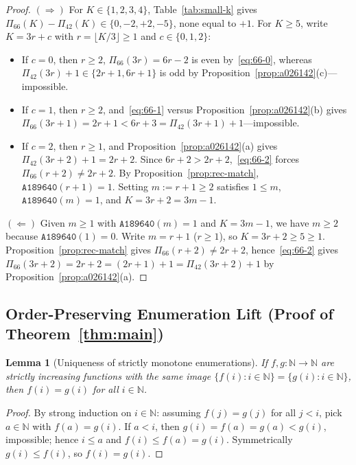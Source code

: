 \documentclass[11pt]{article}
\newtheorem{lemma}[theorem]{Lemma}
\theoremstyle{definition}
\newcommand{\N}{\mathbb{N}}
\newcommand{\seq}[1]{\texttt{#1}}
\begin{document}
\begin{proof}
$(\Rightarrow)$ For $K \in \{1, 2, 3, 4\}$, Table~\ref{tab:small-k} gives $\Pi_{66}(K) - \Pi_{42}(K) \in \{0, -2, +2, -5\}$, none equal to $+1$. For $K \ge 5$, write $K = 3r + c$ with $r = \lfloor K/3 \rfloor \ge 1$ and $c \in \{0, 1, 2\}$:
\begin{itemize}
\item If $c = 0$, then $r \ge 2$, $\Pi_{66}(3r) = 6r - 2$ is even by~\eqref{eq:66-0}, whereas $\Pi_{42}(3r) + 1 \in \{2r + 1, 6r + 1\}$ is odd by Proposition~\ref{prop:a026142}(c)—impossible.
\item If $c = 1$, then $r \ge 2$, and~\eqref{eq:66-1} versus Proposition~\ref{prop:a026142}(b) gives $\Pi_{66}(3r + 1) = 2r + 1 < 6r + 3 = \Pi_{42}(3r + 1) + 1$—impossible.
\item If $c = 2$, then $r \ge 1$, and Proposition~\ref{prop:a026142}(a) gives $\Pi_{42}(3r + 2) + 1 = 2r + 2$. Since $6r + 2 > 2r + 2$,~\eqref{eq:66-2} forces $\Pi_{66}(r + 2) \ne 2r + 2$. By Proposition~\ref{prop:rec-match}, $\seq{A189640}(r + 1) = 1$. Setting $m := r + 1 \ge 2$ satisfies $1 \le m$, $\seq{A189640}(m) = 1$, and $K = 3r + 2 = 3m - 1$.
\end{itemize}

$(\Leftarrow)$ Given $m \ge 1$ with $\seq{A189640}(m) = 1$ and $K = 3m - 1$, we have $m \ge 2$ because $\seq{A189640}(1) = 0$. Write $m = r + 1$ ($r \ge 1$), so $K = 3r + 2 \ge 5 \ge 1$. Proposition~\ref{prop:rec-match} gives $\Pi_{66}(r + 2) \ne 2r + 2$, hence~\eqref{eq:66-2} gives $\Pi_{66}(3r + 2) = 2r + 2 = (2r + 1) + 1 = \Pi_{42}(3r + 2) + 1$ by Proposition~\ref{prop:a026142}(a).
\end{proof}

\subsection{Order-Preserving Enumeration Lift (Proof of Theorem~\ref{thm:main})}

\begin{lemma}[Uniqueness of strictly monotone enumerations]
\label{lem:strict-mono-eq}
If $f, g : \N \to \N$ are strictly increasing functions with the same image $\{f(i) : i \in \N\} = \{g(i) : i \in \N\}$, then $f(i) = g(i)$ for all $i \in \N$.
\end{lemma}

\begin{proof}
By strong induction on $i \in \N$: assuming $f(j) = g(j)$ for all $j < i$, pick $a \in \N$ with $f(a) = g(i)$. If $a < i$, then $g(i) = f(a) = g(a) < g(i)$, impossible; hence $i \le a$ and $f(i) \le f(a) = g(i)$. Symmetrically $g(i) \le f(i)$, so $f(i) = g(i)$.
\end{proof}
\end{document}
